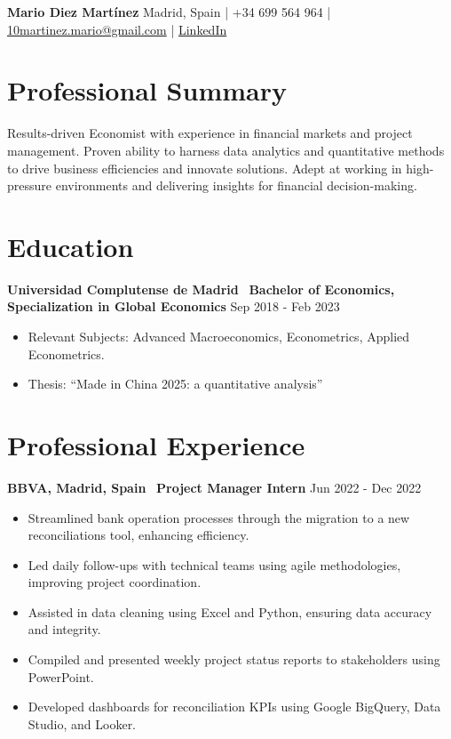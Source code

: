 \documentclass[a4paper,10pt]{article}
\begin{document}
\pagestyle{empty} %

\begin{center}
    {\LARGE \textbf{Mario Diez Martínez}} 
    \vspace{0.2cm}
    Madrid, Spain | +34 699 564 964 | \href{mailto:10martinez.mario@gmail.com}{10martinez.mario@gmail.com} | \href{https://www.linkedin.com/in/mario-diez-martinez}{LinkedIn}
\end{center}

\section*{Professional Summary}
Results-driven Economist with experience in financial markets and project management. Proven ability to harness data analytics and quantitative methods to drive business efficiencies and innovate solutions. Adept at working in high-pressure environments and delivering insights for financial decision-making.

\section*{Education}
\textbf{Universidad Complutense de Madrid} \
\textbf{Bachelor of Economics, Specialization in Global Economics} \hfill Sep 2018 - Feb 2023
\begin{itemize}[left=0em]
    \item Relevant Subjects: Advanced Macroeconomics, Econometrics, Applied Econometrics.
    \item Thesis: ``Made in China 2025: a quantitative analysis''
\end{itemize}

\section*{Professional Experience}
\textbf{BBVA, Madrid, Spain} \
\textbf{Project Manager Intern} \hfill Jun 2022 - Dec 2022
\begin{itemize}[left=0em]
    \item Streamlined bank operation processes through the migration to a new reconciliations tool, enhancing efficiency.
    \item Led daily follow-ups with technical teams using agile methodologies, improving project coordination.
    \item Assisted in data cleaning using Excel and Python, ensuring data accuracy and integrity.
    \item Compiled and presented weekly project status reports to stakeholders using PowerPoint.
    \item Developed dashboards for reconciliation KPIs using Google BigQuery, Data Studio, and Looker.
\end{itemize}
\end{document}
